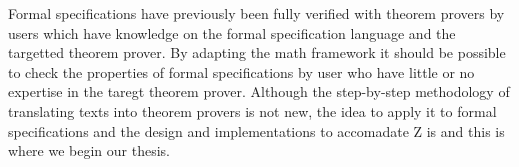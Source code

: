 Formal specifications have previously been fully verified with theorem provers by users which have knowledge on the formal specification language and the targetted theorem prover. By adapting the \gls{math} framework it should be possible to check the properties of formal specifications by user who have little or no expertise in the taregt theorem prover. Although the step-by-step methodology of translating texts into theorem provers is not new, the idea to apply it to formal specifications and the design and implementations to accomadate Z is and this is where we begin our thesis.